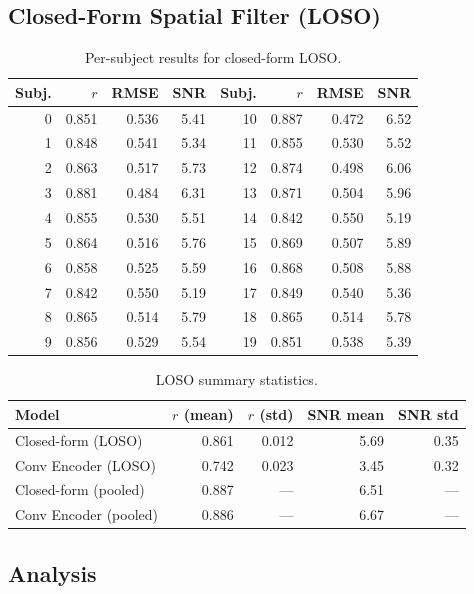 \documentclass[11pt,a4paper]{article}
\begin{document}
\subsection{Closed-Form Spatial Filter (LOSO)}

\begin{table}[H]
\centering
\caption{Per-subject results for closed-form LOSO.}
\begin{tabular}{rrrr|rrrr}
\toprule
Subj. & $r$ & RMSE & SNR & Subj. & $r$ & RMSE & SNR \\
\midrule
0 & 0.851 & 0.536 & 5.41 & 10 & 0.887 & 0.472 & 6.52 \\
1 & 0.848 & 0.541 & 5.34 & 11 & 0.855 & 0.530 & 5.52 \\
2 & 0.863 & 0.517 & 5.73 & 12 & 0.874 & 0.498 & 6.06 \\
3 & 0.881 & 0.484 & 6.31 & 13 & 0.871 & 0.504 & 5.96 \\
4 & 0.855 & 0.530 & 5.51 & 14 & 0.842 & 0.550 & 5.19 \\
5 & 0.864 & 0.516 & 5.76 & 15 & 0.869 & 0.507 & 5.89 \\
6 & 0.858 & 0.525 & 5.59 & 16 & 0.868 & 0.508 & 5.88 \\
7 & 0.842 & 0.550 & 5.19 & 17 & 0.849 & 0.540 & 5.36 \\
8 & 0.865 & 0.514 & 5.79 & 18 & 0.865 & 0.514 & 5.78 \\
9 & 0.856 & 0.529 & 5.54 & 19 & 0.851 & 0.538 & 5.39 \\
\bottomrule
\end{tabular}
\end{table}

\begin{table}[H]
\centering
\caption{LOSO summary statistics.}
\begin{tabular}{lrrrr}
\toprule
Model & $r$ (mean) & $r$ (std) & SNR mean & SNR std \\
\midrule
Closed-form (LOSO) & 0.861 & 0.012 & 5.69 & 0.35 \\
Conv Encoder (LOSO) & 0.742 & 0.023 & 3.45 & 0.32 \\
Closed-form (pooled) & 0.887 & --- & 6.51 & --- \\
Conv Encoder (pooled) & 0.886 & --- & 6.67 & --- \\
\bottomrule
\end{tabular}
\end{table}

\subsection{Analysis}
\end{document}
